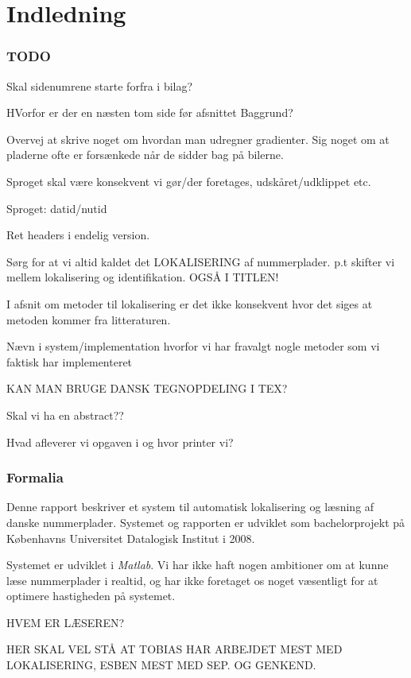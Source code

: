 \section{Indledning}

\subsubsection*{TODO}
Skal sidenumrene starte forfra i bilag?

HVorfor er der en næsten tom side før afsnittet Baggrund?

Overvej at skrive noget om hvordan man udregner gradienter.
Sig noget om at pladerne ofte er forsænkede når de sidder bag på bilerne.

Sproget skal være konsekvent vi gør/der foretages, udskåret/udklippet etc.

Sproget: datid/nutid

Ret headers i endelig version.

Sørg for at vi altid kaldet det LOKALISERING af nummerplader. p.t skifter vi mellem lokalisering og identifikation. OGSÅ I TITLEN!

I afsnit om metoder til lokalisering er det ikke konsekvent hvor det siges at metoden kommer fra litteraturen.

Nævn i system/implementation hvorfor vi har fravalgt nogle metoder som vi faktisk har implementeret

KAN MAN BRUGE DANSK TEGNOPDELING I TEX?

Skal vi ha en abstract??

Hvad afleverer vi opgaven i og hvor printer vi?

\subsubsection*{Formalia}

Denne rapport beskriver et system til automatisk lokalisering og læsning af danske nummerplader. Systemet og rapporten er udviklet som bachelorprojekt på Københavns Universitet Datalogisk Institut i 2008.

Systemet er udviklet i \textit{Matlab}. Vi har ikke haft nogen ambitioner om at kunne læse nummerplader i realtid, og har ikke foretaget os noget væsentligt for at optimere hastigheden på systemet.

HVEM ER LÆSEREN?

HER SKAL VEL STÅ AT TOBIAS HAR ARBEJDET MEST MED LOKALISERING, ESBEN MEST MED SEP. OG GENKEND.

